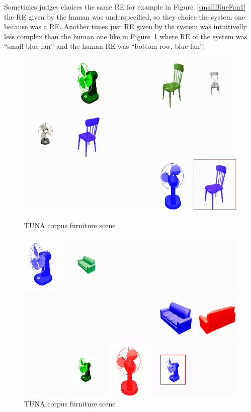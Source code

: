 Sometimes judges choices the same RE for example in Figure~\ref{smallBlueFan1} the RE given by the human was underspecified, so they choice the system one because was a RE. Another times just RE given by the system was intuitivelly less complex than the human one like in Figure~\ref{smallBlueFan} where RE of the system was ``small blue fan'' and the human RE was ``bottom row, blue fan''.
\begin{figure}[ht]
\begin{minipage}{0.50\linewidth}
\centering
\includegraphics[width=\textwidth]{images/tuna.jpg} %
\caption{TUNA corpus furniture scene}
\label{smallBlueFan1}
\end{minipage}
\begin{minipage}{0.50\linewidth}
\centering
\includegraphics[width=\textwidth]{images/smallBlueFan.jpg}
\caption{TUNA corpus furniture scene}
\label{smallBlueFan}
\end{minipage}
\end{figure}

